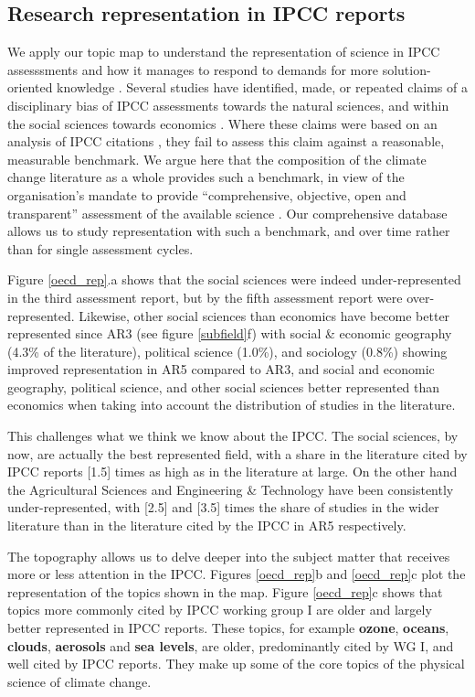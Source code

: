 \documentclass{article}
\begin{document}
\begin{linenumbers}
		\subsection*{Research representation in IPCC reports}
		We apply our topic map to understand the representation of science in IPCC assesssments and how it manages to respond to demands for more solution-oriented knowledge \cite{Kowarsch2017}. Several studies have identified, made, or repeated claims of a disciplinary bias of IPCC assessments towards the natural sciences, and within the social sciences towards economics \cite{Bjurström2011, Victor2015, Hulme2010, Corbera2016}. Where these claims were based on an analysis of IPCC citations \cite{Bjurström2011}, they fail to assess this claim against a reasonable, measurable benchmark. We argue here that the composition of the climate change literature as a whole provides such a benchmark, in view of the organisation's mandate to provide ``comprehensive, objective, open and transparent'' assessment of the available science \cite{IPCC2013}. Our comprehensive database allows us to study representation with such a benchmark, and over time rather than for single assessment cycles.
		
		Figure \ref{oecd_rep}.a shows that the social sciences were indeed under-represented in the third assessment report, but by the fifth assessment report were over-represented. Likewise, other social sciences than economics have become better represented since AR3  (see figure \ref{subfield}f) with social \& economic geography (4.3\% of the literature), political science (1.0\%), and sociology (0.8\%) showing improved representation in AR5 compared to AR3, and social and economic geography, political science, and other social sciences better represented than economics when taking into account the distribution of studies in the literature. 
		
		This challenges what we think we know about the IPCC. The social sciences, by now, are actually the best represented field, with a share in the literature cited by IPCC reports [1.5] times as high as in the literature at large.  On the other hand the Agricultural Sciences and Engineering \& Technology have been consistently under-represented, with [2.5] and [3.5] times the share of studies in the wider literature than in the literature cited by the IPCC in AR5 respectively. 
		
		
		The topography allows us to delve deeper into the subject matter that receives more or less attention in the IPCC. Figures \ref{oecd_rep}b and \ref{oecd_rep}c plot the representation of the topics shown in the map. Figure \ref{oecd_rep}c shows that topics more commonly cited by IPCC working group I are older and largely better represented in IPCC reports. These topics, for example \textbf{ozone}, \textbf{oceans}, \textbf{clouds}, \textbf{aerosols} and \textbf{sea levels}, are older, predominantly cited by WG I, and well cited by IPCC reports. They make up some of the core topics of the physical science of climate change.
		

\end{linenumbers}
\end{document}
